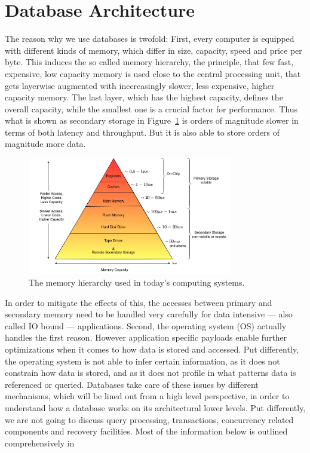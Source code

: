 \section{Database Architecture}\label{db-arch}
    The reason why we use databases is twofold:
    First, every computer is equipped with different kinds of memory, which differ in size, capacity, speed and price per byte. 
    This induces the so called memory hierarchy, the principle, that few fast, expensive, low capacity memory is used close to the central processing unit, that gets layerwise augmented with inccreasingly slower, less expensive, higher capacity memory. 
    The last layer, which has the highest capacity, defines the overall capacity, while the smallest one is a crucial factor for performance.
    Thus what is shown as secondary storage in Figure~\ref{mem-hier} is orders of magnitude slower in terms of both latency and throughput.
    But it is also able to store orders of magnitude more data. 
    \begin{figure}[htp]
        \begin{center}
        \includegraphics[keepaspectratio,width=0.8\textwidth]{img/04-databases/mem-hierarch.png}
        \end{center}
        \caption{The memory hierarchy used in today's computing systems.} 
        \label{mem-hier}
    \end{figure}
    In order to mitigate the effects of this, the accesses between primary and secondary memory need to be handled very carefully for data intensive --- also called IO bound --- applications.
    Second, the operating system (OS) actually handles the first reason. 
    However application specific payloads enable further optimizations when it comes to how data is stored and accessed.
    Put differently, the operating system is not able to infer certain information, as it does not constrain how data is stored, and as it does not profile in what patterns data is referenced or queried.
    Databases take care of these issues by different mechanisms, which will be lined out from a high level perspective, in order to understand how a database works on its architectural lower levels.
    Put differently, we are not going to discuss query processing, transactions, concurrency related components and recovery facilities.
    Most of the information below is outlined comprehensively in~\autocite{ramakrishnan2000database, silberschatz1997database}
    
